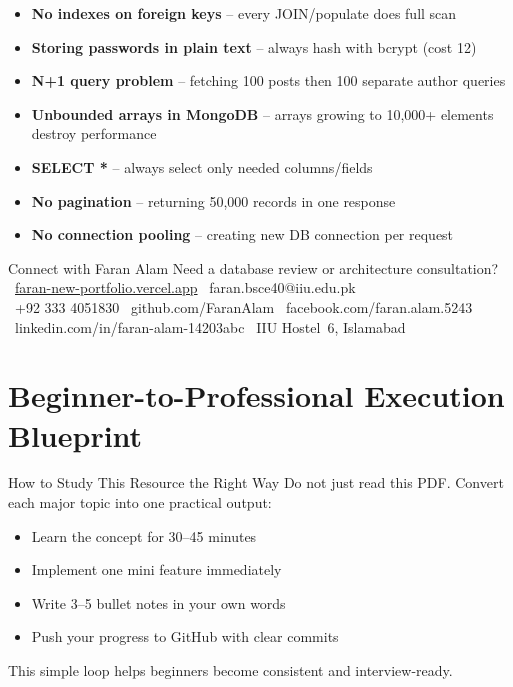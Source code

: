 \documentclass[12pt,a4paper]{article}
\begin{document}
\begin{warningbox}
\begin{itemize}[leftmargin=1.5em, itemsep=5pt]
    \item[\ding{55}] \textbf{No indexes on foreign keys} -- every JOIN/populate does full scan
    \item[\ding{55}] \textbf{Storing passwords in plain text} -- always hash with bcrypt (cost 12)
    \item[\ding{55}] \textbf{N+1 query problem} -- fetching 100 posts then 100 separate author queries
    \item[\ding{55}] \textbf{Unbounded arrays in MongoDB} -- arrays growing to 10,000+ elements destroy performance
    \item[\ding{55}] \textbf{SELECT *} -- always select only needed columns/fields
    \item[\ding{55}] \textbf{No pagination} -- returning 50,000 records in one response
    \item[\ding{55}] \textbf{No connection pooling} -- creating new DB connection per request
\end{itemize}
\end{warningbox}

\vspace{0.5cm}
\begin{infobox}{Connect with Faran Alam}
Need a database review or architecture consultation?\\[0.2cm]
\faGlobe\ \href{https://faran-new-portfolio.vercel.app/}{faran-new-portfolio.vercel.app} \quad \faEnvelope\ faran.bsce40@iiu.edu.pk\\[0.1cm]
\faWhatsapp\ +92 333 4051830 \quad \faGithub\ github.com/FaranAlam \quad \faFacebook\ facebook.com/faran.alam.5243\\[0.1cm]
\faLinkedin\ linkedin.com/in/faran-alam-14203abc \quad \faMapMarkerAlt\ IIU Hostel~6, Islamabad
\end{infobox}


\section{Beginner-to-Professional Execution Blueprint}

\begin{infobox}{How to Study This Resource the Right Way}
Do not just read this PDF. Convert each major topic into one practical output:
\begin{itemize}[leftmargin=1.5em, itemsep=4pt]
    \item[\ding{52}] Learn the concept for 30--45 minutes
    \item[\ding{52}] Implement one mini feature immediately
    \item[\ding{52}] Write 3--5 bullet notes in your own words
    \item[\ding{52}] Push your progress to GitHub with clear commits
\end{itemize}
This simple loop helps beginners become consistent and interview-ready.
\end{infobox}
\end{document}
